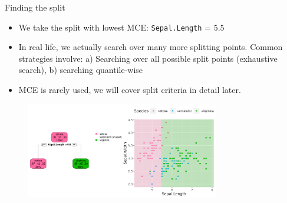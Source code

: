 \documentclass[11pt,compress,t,notes=noshow, xcolor=table]{beamer}
\begin{document}
\begin{vbframe}{Finding the split}

\begin{itemize}
\item We take the split with lowest MCE: \texttt{Sepal.Length} = $5.5$
\item In real life, we actually search over many more splitting points.
Common strategies involve: a) Searching over all possible split points (exhaustive search), b) searching quantile-wise 
\item MCE is rarely used, we will cover split criteria in detail later.
\end{itemize}


\begin{figure}
\includegraphics[width=0.75\textwidth]{figure/tree-classif-depth1.pdf}
\end{figure}

\end{vbframe}



% 
% 
% 
% 






\endlecture
\end{document}

